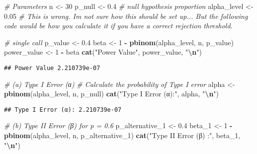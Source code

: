 \documentclass[
]{article}
\newenvironment{Shaded}{\begin{snugshade}}{\end{snugshade}}
\newcommand{\CommentTok}[1]{\textcolor[rgb]{0.56,0.35,0.01}{\textit{#1}}}
\newcommand{\DecValTok}[1]{\textcolor[rgb]{0.00,0.00,0.81}{#1}}
\newcommand{\FloatTok}[1]{\textcolor[rgb]{0.00,0.00,0.81}{#1}}
\newcommand{\FunctionTok}[1]{\textcolor[rgb]{0.13,0.29,0.53}{\textbf{#1}}}
\newcommand{\NormalTok}[1]{#1}
\newcommand{\OtherTok}[1]{\textcolor[rgb]{0.56,0.35,0.01}{#1}}
\newcommand{\SpecialCharTok}[1]{\textcolor[rgb]{0.81,0.36,0.00}{\textbf{#1}}}
\newcommand{\StringTok}[1]{\textcolor[rgb]{0.31,0.60,0.02}{#1}}
\begin{document}
\begin{Shaded}
\begin{Highlighting}[]
\CommentTok{\# Parameters}
\NormalTok{n }\OtherTok{\textless{}{-}} \DecValTok{30}  
\NormalTok{p\_null }\OtherTok{\textless{}{-}} \FloatTok{0.4}  \CommentTok{\# null hypothesis proportion}
\NormalTok{alpha\_level }\OtherTok{\textless{}{-}} \FloatTok{0.05} \CommentTok{\# This is wrong. I\textquotesingle{}m not sure how this should be set up... But the following code would be how you calculate it if you have a correct rejection threshold.}

\CommentTok{\# single call}
\NormalTok{p\_value }\OtherTok{\textless{}{-}} \FloatTok{0.4}
\NormalTok{beta }\OtherTok{\textless{}{-}} \DecValTok{1} \SpecialCharTok{{-}} \FunctionTok{pbinom}\NormalTok{(alpha\_level, n, p\_value)}
\NormalTok{power\_value }\OtherTok{\textless{}{-}} \DecValTok{1} \SpecialCharTok{{-}}\NormalTok{ beta}
\FunctionTok{cat}\NormalTok{(}\StringTok{"Power Value"}\NormalTok{, power\_value, }\StringTok{"}\SpecialCharTok{\textbackslash{}n}\StringTok{"}\NormalTok{)}
\end{Highlighting}
\end{Shaded}

\begin{verbatim}
## Power Value 2.210739e-07
\end{verbatim}

\begin{Shaded}
\begin{Highlighting}[]
\CommentTok{\# (a) Type I Error (α)}
\CommentTok{\# Calculate the probability of Type I error}
\NormalTok{alpha }\OtherTok{\textless{}{-}} \FunctionTok{pbinom}\NormalTok{(alpha\_level, n, p\_null)}
\FunctionTok{cat}\NormalTok{(}\StringTok{"Type I Error (α):"}\NormalTok{, alpha, }\StringTok{"}\SpecialCharTok{\textbackslash{}n}\StringTok{"}\NormalTok{)}
\end{Highlighting}
\end{Shaded}

\begin{verbatim}
## Type I Error (α): 2.210739e-07
\end{verbatim}

\begin{Shaded}
\begin{Highlighting}[]
\CommentTok{\# (b) Type II Error (β) for p = 0.6}
\NormalTok{p\_alternative\_1 }\OtherTok{\textless{}{-}} \FloatTok{0.4}
\NormalTok{beta\_1 }\OtherTok{\textless{}{-}} \DecValTok{1} \SpecialCharTok{{-}} \FunctionTok{pbinom}\NormalTok{(alpha\_level, n, p\_alternative\_1)}
\FunctionTok{cat}\NormalTok{(}\StringTok{"Type II Error (β) :"}\NormalTok{, beta\_1, }\StringTok{"}\SpecialCharTok{\textbackslash{}n}\StringTok{"}\NormalTok{)}
\end{Highlighting}
\end{Shaded}
\end{document}
